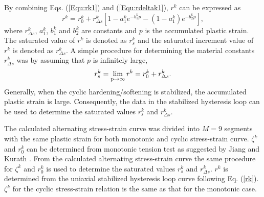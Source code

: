 \documentclass[preprint,5p,twocolumn,11pt,sort&compress]{elsarticle}
\begin{document}
By combining Eqs. (\ref{Equ:rk1}) and (\ref{Equ:rdeltak1}), $r^k$ can be expressed as
\begin{equation}\label{rk}
{r^k} = r_0^k + r_{\Delta s}^k\left[ {1 - a_1^k{e^{ - b_1^kp}} - (1-a_1^k){e^{ - b_2^kp}} }\right],
\end{equation}
where $r_{\Delta s}^k$, $a_1^k$, $b_1^k$ and $b_2^k$ are constants and $p$ is the accumulated plastic strain.
The saturated value of $r^k$ is denoted as $r^k_s$ and the saturated increment value of $r^k$ is denoted as $r^k_{\Delta s}$.
A simple procedure for determining the material constants $r_{\Delta s}^k$ was by assuming that $p$ is infinitely large,
\begin{equation}
r_s^k=\mathop {\lim }\limits_{{\rm{p}} \to \infty } {r^k} = r_0^k + r_{\Delta s}^k.
\label{Equ:rsk}
\end{equation}
Generally, when the cyclic hardening/softening is stabilized, the accumulated plastic strain is large.
Consequently, the data in the stabilized hysteresis loop can be used to determine the saturated values $r^k_s$ and $r^k_{\Delta s}$.

The calculated alternating stress-strain curve was divided into $M=9$ segments with the same plastic strain for both monotonic and cyclic stress-strain curve.  $\zeta^k$ and $r_0^k$ can be determined from monotonic tension test as suggested by Jiang and Kurath \cite{Jiang1996387}. From the calculated alternating stress-strain curve the same procedure for $\zeta^k$ and $r_0^k$ is used to determine the saturated values $r^k_s$ and $r^k_{\Delta s}$.  $r^k$ is determined from the uniaxial stabilized hysteresis loop curve following Eq. (\ref{rk}). ${\zeta ^k}$ for the cyclic stress-strain relation is the same as that for the monotonic case.

\end{document}
